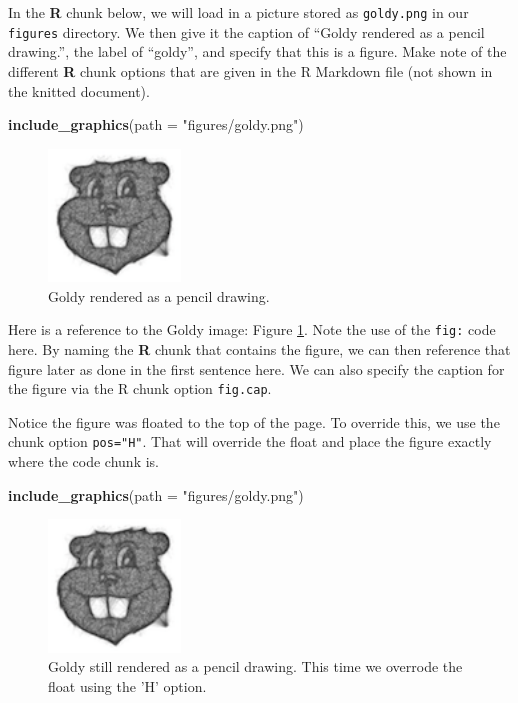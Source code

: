 \documentclass[12pt,letterpaper,oneside,oldfontcommands]{memoir}
\newenvironment{Shaded}{\begin{snugshade}}{\end{snugshade}}
\newcommand{\DataTypeTok}[1]{\textcolor[rgb]{0.13,0.29,0.53}{#1}}
\newcommand{\KeywordTok}[1]{\textcolor[rgb]{0.13,0.29,0.53}{\textbf{#1}}}
\newcommand{\NormalTok}[1]{#1}
\newcommand{\StringTok}[1]{\textcolor[rgb]{0.31,0.60,0.02}{#1}}
\theoremstyle{definition}
\theoremstyle{definition}
\theoremstyle{definition}
\theoremstyle{remark}
\begin{document}
In the \textbf{R} chunk below, we will load in a picture stored as
\texttt{goldy.png} in our \texttt{figures} directory. We then give it
the caption of ``Goldy rendered as a pencil drawing.'', the label of
``goldy'', and specify that this is a figure. Make note of the different
\textbf{R} chunk options that are given in the R Markdown file (not
shown in the knitted document).

\begin{Shaded}
\begin{Highlighting}[]
\KeywordTok{include_graphics}\NormalTok{(}\DataTypeTok{path =} \StringTok{"figures/goldy.png"}\NormalTok{)}
\end{Highlighting}
\end{Shaded}

\begin{figure}
\includegraphics[width=1.39in]{figures/goldy} \caption{Goldy rendered as a pencil drawing.}\label{fig:goldy}
\end{figure}

Here is a reference to the Goldy image: Figure \ref{fig:goldy}. Note the
use of the \texttt{fig:} code here. By naming the \textbf{R} chunk that
contains the figure, we can then reference that figure later as done in
the first sentence here. We can also specify the caption for the figure
via the R chunk option \texttt{fig.cap}.

Notice the figure was floated to the top of the page. To override this,
we use the chunk option \texttt{pos="H"}. That will override the float
and place the figure exactly where the code chunk is.

\begin{Shaded}
\begin{Highlighting}[]
\KeywordTok{include_graphics}\NormalTok{(}\DataTypeTok{path =} \StringTok{"figures/goldy.png"}\NormalTok{)}
\end{Highlighting}
\end{Shaded}

\begin{figure}[H]
\includegraphics[width=1.39in]{figures/goldy} \caption{Goldy still rendered as a pencil drawing. This time we overrode the float using the 'H' option.}\label{fig:goldy2}
\end{figure}
\end{document}
